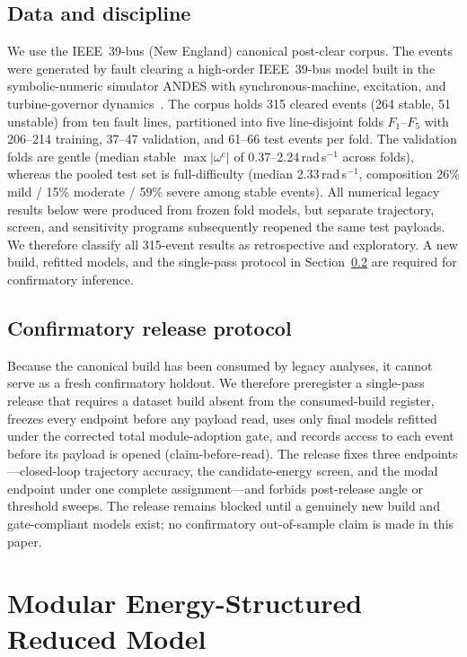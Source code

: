 \documentclass[journal]{IEEEtran}
\begin{document}
\subsection{Data and discipline}
\label{sec:data}
We use the IEEE~39-bus (New England) canonical post-clear corpus. The events
were generated by fault clearing a high-order IEEE~39-bus model built in the
symbolic-numeric simulator ANDES with synchronous-machine, excitation, and
turbine-governor dynamics~\cite{cui2021andes,athay1979practical}. The corpus
holds 315 cleared events (264 stable, 51 unstable) from ten fault lines,
partitioned into five line-disjoint folds $F_1$--$F_5$ with 206--214 training,
37--47 validation, and 61--66 test events per fold. The validation folds are
gentle (median stable
$\max|\omega^{\mathrm c}|$ of 0.37--2.24\,rad\,s$^{-1}$ across folds), whereas
the pooled test set is full-difficulty (median 2.33\,rad\,s$^{-1}$, composition
26\% mild / 15\% moderate / 59\% severe among stable events). All numerical
legacy results below were produced from frozen fold models, but separate
trajectory, screen, and sensitivity programs subsequently reopened the same
test payloads. We therefore classify all 315-event results as retrospective and
exploratory. A new build, refitted models, and the single-pass protocol in
Section~\ref{sec:release} are required for confirmatory inference.

\subsection{Confirmatory release protocol}
\label{sec:release}
Because the canonical build has been consumed by legacy analyses, it cannot serve
as a fresh confirmatory holdout. We therefore preregister a single-pass release
that requires a dataset build absent from the consumed-build register, freezes
every endpoint before any payload read, uses only final models refitted under the
corrected total module-adoption gate, and records access to each event before its
payload is opened (claim-before-read). The release fixes three
endpoints---closed-loop trajectory accuracy, the candidate-energy screen, and
the modal endpoint under one complete assignment---and forbids post-release angle
or threshold sweeps. The release remains blocked until a genuinely new build and
gate-compliant models exist; no confirmatory out-of-sample claim is made in this
paper.

\section{Modular Energy-Structured Reduced Model}
\label{sec:model}
\end{document}
